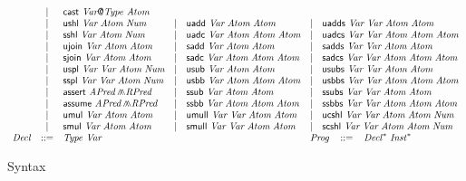 \begin{figure*}
\begin{math}
\begin{array}{rclclcl}
      & | & \clVPCast\ \clVar\mytextsf{@}\mathit{Type}\ \clAtom\\
      & | & \clUShl\ \clVar\ \clAtom\ \clNum
      & | & \clUAdd\ \clVar\ \clAtom\ \clAtom
      & | & \clUAdds\ \clVar\ \clVar\
            \clAtom\ \clAtom\\
      & | & \clSShl\ \clVar\ \clAtom\ \clNum
      & | & \clUAdc\ \clVar\ \clAtom\
            \clAtom\ \clAtom
      & | & \clUAdcs\ \clVar\ \clVar\
            \clAtom\ \clAtom\ \clAtom\\
      & | & \clUJoin\ \clVar\ \clAtom\ \clAtom
      & | & \clSAdd\ \clVar\ \clAtom\ \clAtom
      & | & \clSAdds\ \clVar\ \clVar\
            \clAtom\ \clAtom\\
      & | & \clSJoin\ \clVar\ \clAtom\ \clAtom
      & | & \clSAdc\ \clVar\ \clAtom\
            \clAtom\ \clAtom
      & | & \clSAdcs\ \clVar\ \clVar\
            \clAtom\ \clAtom\ \clAtom\\
      & | & \clUSplit\ \clVar\ \clVar\
            \clAtom\ \clNum
      & | & \clUSub\ \clVar\ \clAtom\ \clAtom
      & | & \clUSubs\ \clVar\ \clVar\
            \clAtom\ \clAtom\\
      & | & \clSSplit\ \clVar\ \clVar\
            \clAtom\ \clNum
      & | & \clUSbb\ \clVar\ \clAtom\
            \clAtom\ \clAtom
      & | & \clUSbbs\ \clVar\ \clVar\
            \clAtom\ \clAtom\ \clAtom\\
      & | & \clAssert\ \clAPred \clConj \clRPred
      & | & \clSSub\ \clVar\ \clAtom\ \clAtom
      & | & \clSSubs\ \clVar\ \clVar\
            \clAtom\ \clAtom\\
      & | & \clAssume\ \clAPred \clConj \clRPred
      & | & \clSSbb\ \clVar\ \clAtom\
            \clAtom\ \clAtom
      & | & \clSSbbs\ \clVar\ \clVar\
            \clAtom\ \clAtom\ \clAtom\\
      & | & \clUMul\ \clVar\ \clAtom\ \clAtom
      & | & \clUMull\ \clVar\ \clVar\
            \clAtom\ \clAtom
      & | & \clUCShl\ \clVar\ \clVar\
            \clAtom\ \clAtom\ \clNum\\
      & | & \clSMul\ \clVar\ \clAtom\ \clAtom
      & | & \clSMull\ \clVar\ \clVar\
            \clAtom\ \clAtom
      & | & \clSCShl\ \clVar\ \clVar\
            \clAtom\ \clAtom\ \clNum\\
      \mathit{Decl} & ::= &
        \multicolumn{2}{l}{\mathit{Type}\ \clVar}
      &&
      \multicolumn{2}{l}{
         \mathit{Prog} \hspace{2ex} ::=\hspace{2ex}
         \mathit{Decl}^*\ \mathit{Inst}^*
      }
    \end{array}
  \end{math}
  \caption{\cryptoline Syntax}
  \label{figure:cryptoline-syntax}
\end{figure*}

